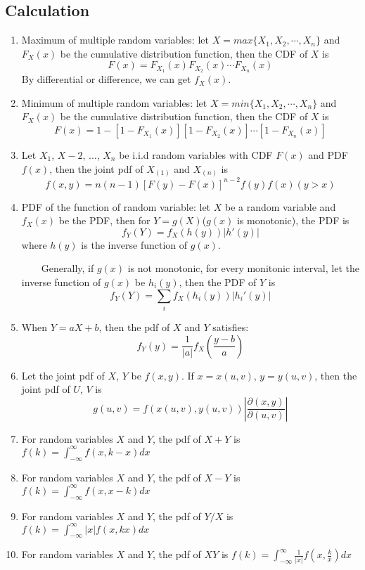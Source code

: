 \documentclass[a4paper]{article}
\begin{document}
\subsection{Calculation}
	\begin{enumerate}
	\item Maximum of multiple random variables: let $X=max\{X_1,X_2,\cdots,X_n\}$ and $F_X(x)$ be the cumulative distribution function, then the CDF of $X$ is
$$F(x)=F_{X_1}(x)F_{X_2}(x)\cdots F_{X_n}(x)$$
By differential or difference, we can get $f_X(x)$.
	\item Minimum of multiple random variables: let $X=min\{X_1,X_2,\cdots,X_n\}$ and $F_X(x)$ be the cumulative distribution function, then the CDF of $X$ is
$$F(x)=1-[1-F_{X_1}(x)][1-F_{X_2}(x)]\cdots[1-F_{X_n}(x)]$$
	\item Let $X_1$, $X-2$, ..., $X_n$ be i.i.d random variables with CDF $F(x)$ and PDF $f(x)$, then 
the joint pdf of $X_{(1)}$ and $X_{(n)}$ is 
$$f(x,y)=n(n-1)[F(y)-F(x)]^{n-2}f(y)f(x)(y>x)$$
	\item PDF of the function of random variable: let $X$ be a random variable and $f_X(x)$ be the PDF, then for $Y=g(X)$($g(x)$ is monotonic), the PDF is 
$$f_Y(Y)=f_X(h(y))|h'(y)|$$ where $h(y)$ is the inverse function of $g(x)$. 

\ \ \ \ Generally, if $g(x)$ is not monotonic, for every monitonic interval, let the inverse function of $g(x)$ be $h_i(y)$, then the PDF of $Y$ is 
$$f_Y(Y)=\sum_i f_X(h_i(y))|h_i'(y)|$$
	\item When $Y=aX+b$, then the pdf of $X$ and $Y$ satisfies:
$$f_Y(y)=\frac{1}{|a|}f_X(\frac{y-b}{a})$$
	\item Let the joint pdf of $X$, $Y$ be $f(x,y)$. If $x=x(u,v)$, $y=y(u,v)$, then the joint pdf of $U$, $V$ is
$$g(u,v)=f(x(u,v),y(u,v))|\frac{\partial(x,y)}{\partial(u,v)}|$$
	\item For random variables $X$ and $Y$, the pdf of $X+Y$ is \\
$f(k)=\int_{-\infty}^\infty f(x,k-x)dx$
	\item For random variables $X$ and $Y$, the pdf of $X-Y$ is \\
$f(k)=\int_{-\infty}^\infty f(x,x-k)dx$
	\item For random variables $X$ and $Y$, the pdf of $Y/X$ is 
$f(k)=\int_{-\infty}^\infty|x|f(x,kx)dx$
	\item For random variables $X$ and $Y$, the pdf of $XY$ is 
$f(k)=\int_{-\infty}^\infty\frac{1}{|x|}f(x,\frac{k}{x})dx$
	\end{enumerate}
\end{document}
